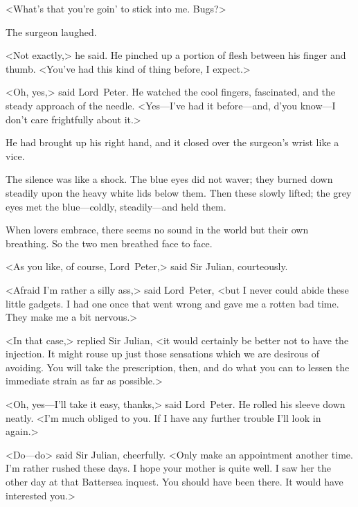 <What's that you're goin' to stick into me. Bugs?>

The surgeon laughed.

<Not exactly,> he said. He pinched up a portion of flesh between his finger and thumb. <You've had this kind of thing before, I expect.>

<Oh, yes,> said Lord~Peter. He watched the cool fingers, fascinated, and the steady approach of the needle. <Yes—I've had it before—and, d'you know—I don't care frightfully about it.>

He had brought up his right hand, and it closed over the surgeon's wrist like a vice.

The silence was like a shock. The blue eyes did not waver; they burned down steadily upon the heavy white lids below them. Then these slowly lifted; the grey eyes met the blue—coldly, steadily—and held them.

When lovers embrace, there seems no sound in the world but their own breathing. So the two men breathed face to face.

<As you like, of course, Lord~Peter,> said Sir Julian, courteously.

<Afraid I'm rather a silly ass,> said Lord~Peter, <but I never could abide these little gadgets. I had one once that went wrong and gave me a rotten bad time. They make me a bit nervous.>

<In that case,> replied Sir Julian, <it would certainly be better not to have the injection. It might rouse up just those sensations which we are desirous of avoiding. You will take the prescription, then, and do what you can to lessen the immediate strain as far as possible.>

<Oh, yes—I'll take it easy, thanks,> said Lord~Peter. He rolled his sleeve down neatly. <I'm much obliged to you. If I have any further trouble I'll look in again.>

<Do—do\longdash> said Sir Julian, cheerfully. <Only make an appointment another time. I'm rather rushed these days. I hope your mother is quite well. I saw her the other day at that Battersea inquest. You should have been there. It would have interested you.>